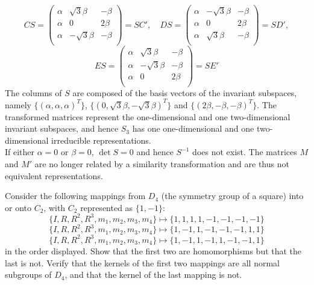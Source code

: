 \documentclass[a4paper]{article}
\begin{document}
\begin{ans}
$$CS=\begin{pmatrix}\alpha&\sqrt{3}\beta&-\beta\\\alpha&0&2\beta\\\alpha&-\sqrt{3}\beta&-\beta\\\end{pmatrix}=SC',\quad DS=\begin{pmatrix}\alpha&-\sqrt{3}\beta&-\beta\\\alpha&0&2\beta\\\alpha&\sqrt{3}\beta&-\beta\\\end{pmatrix}=SD',$$
$$ES=\begin{pmatrix}\alpha&\sqrt{3}\beta&-\beta\\\alpha&-\sqrt{3}\beta&-\beta\\\alpha&0&2\beta\\\end{pmatrix}=SE'$$
The columns of $S$ are composed of the basis vectors of the invariant subspaces, namely $\{(\alpha,\alpha,\alpha)^T\}$, $\{(0,\sqrt{3}\beta,-\sqrt{3}\beta)^T\}$ and $\{(2\beta,-\beta,-\beta)^T\}$. The transformed matrices represent the one-dimensional and one two-dimensional invariant subspaces, and hence $S_3$ has one one-dimensional and one two-dimensional irreducible representations.\\[5pt]
If either $\alpha=0$ or $\beta=0$, $\det S=0$ and hence $S^{-1}$ does not exist. The matrices $M$ and $M'$ are no longer related by a similarity transformation and are thus not equivalent representations.
\end{ans}
\newpage
\begin{qns}
Consider the following mappings from $D_4$ (the symmetry group of a square) into or onto $C_2$, with $C_2$ represented as $\{1, −1\}$:
$$\{I,R,R^2,R^3,m_1,m_2,m_3,m_4\} \mapsto \{1, 1, 1, 1, −1, −1, −1, −1\}$$
$$\{I,R,R^2,R^3,m_1,m_2,m_3,m_4\} \mapsto \{1, −1, 1, −1, −1, −1, 1, 1\}$$
$$\{I,R,R^2,R^3,m_1,m_2,m_3,m_4\} \mapsto \{1, −1, 1, −1, 1, −1, −1, 1\}$$
in the order displayed. Show that the first two are homomorphisms but that the last is not. Verify that the kernels of the first two mappings are all normal subgroups of $D_4$, and that the kernel of the last mapping is not.
\end{qns}
\end{document}
